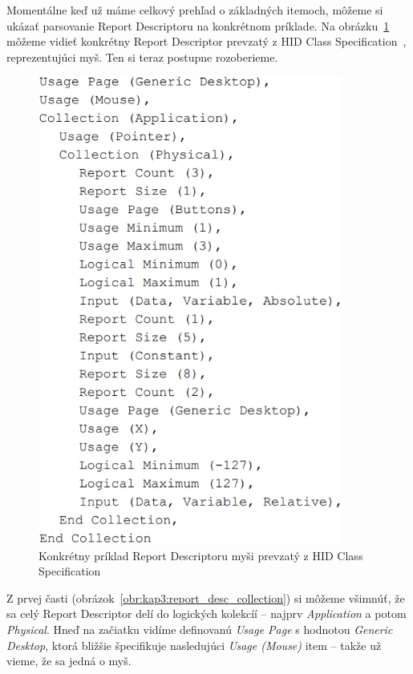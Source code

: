 Momentálne keď už máme celkový prehľad o základných itemoch, môžeme si ukázať parsovanie Report Descriptoru na konkrétnom príklade. Na obrázku~\ref{obr:kap3:full_report_desc} môžeme vidieť konkrétny Report Descriptor prevzatý z HID Class Specification~\cite{report_desc_mouse}, reprezentujúci myš. Ten si teraz postupne rozoberieme.

\begin{figure}[!htb]
	\centering
	\includegraphics[width=10cm]{img/kap03_full_report_desc}
	\caption{Konkrétny príklad Report Descriptoru myši prevzatý z HID Class Specification~\cite{report_desc_mouse}}
	\label{obr:kap3:full_report_desc}
\end{figure}

\newpage

Z prvej časti (obrázok~\ref{obr:kap3:report_desc_collection}) si môžeme všimnúť, že sa celý Report Descriptor delí do logických kolekcíí -- najprv \textit{Application} a potom \textit{Physical}. Hneď na začiatku vidíme definovanú \textit{Usage Page} s hodnotou \textit{Generic Desktop}, ktorá bližšie špecifikuje nasledujúci \textit{Usage (Mouse)} item -- takže už vieme, že sa jedná o myš. 

